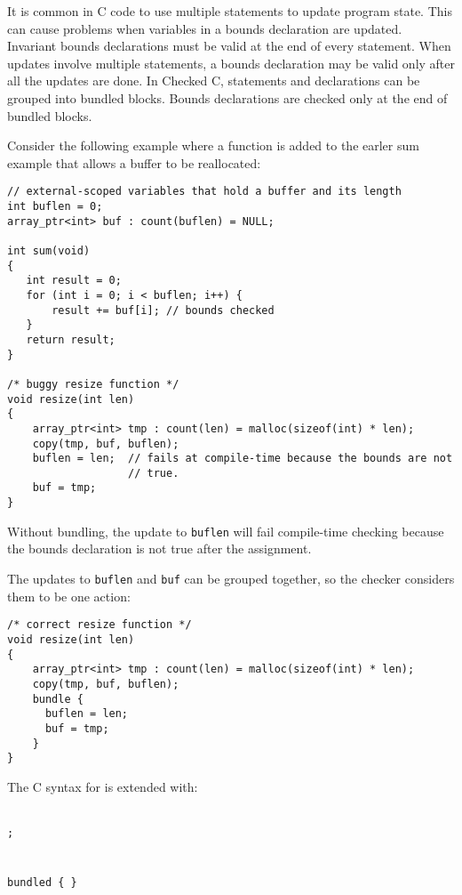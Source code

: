 It is common in C code to use multiple statements to update program state.
This can cause problems when variables in a bounds declaration are updated.
Invariant bounds declarations must be valid at the end of every statement.
When updates involve multiple statements, a bounds declaration may be valid only
after all the updates are done.  In Checked C, statements and declarations can be 
grouped into bundled blocks.  Bounds declarations are checked only at the end of bundled blocks.

Consider the following example where a function is added to the earler sum
example that allows a buffer to be reallocated:
\begin{lstlisting}
// external-scoped variables that hold a buffer and its length
int buflen = 0;
array_ptr<int> buf : count(buflen) = NULL;

int sum(void)
{
   int result = 0;
   for (int i = 0; i < buflen; i++) {
       result += buf[i]; // bounds checked
   }
   return result;
}

/* buggy resize function */
void resize(int len) 
{
    array_ptr<int> tmp : count(len) = malloc(sizeof(int) * len);
    copy(tmp, buf, buflen);
    buflen = len;  // fails at compile-time because the bounds are not
                   // true.
    buf = tmp;
}
\end{lstlisting}
Without bundling, the update to \texttt{buflen} will fail
compile-time checking because the bounds declaration is not true after the
assignment.

The updates to \texttt{buflen} and \texttt{buf} can be grouped together,
so the checker considers them to be one action:
\begin{lstlisting}
/* correct resize function */
void resize(int len) 
{
    array_ptr<int> tmp : count(len) = malloc(sizeof(int) * len);
    copy(tmp, buf, buflen);
    bundle {
      buflen = len;
      buf = tmp;
    }
}
\end{lstlisting}

The C syntax for is extended with:
\begin{tabbing}
\=\\
\>\texttt{;} \\
\\
 \\
\>\texttt{bundled \{  \}} \\
\\
\\
\>  \\
\>  \\
\\
\\
\> \\
\>  
\end{tabbing}

